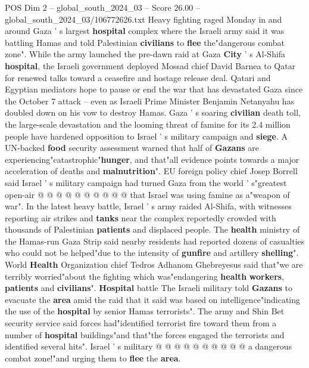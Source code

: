\begin{textsample}{POS Dim 2 – global\_south\_2024\_03 – Score 26.00 – global\_south\_2024\_03/106772626.txt}  \label{ex:f2_pos_014}
Heavy fighting raged Monday in and around Gaza ' s largest \textbf{hospital} complex where the Israeli army said it was battling Hamas and told Palestinian \textbf{civilians} to \textbf{flee} the"dangerous combat zone".
While the army launched the pre-dawn raid at Gaza \textbf{City} ' s Al-Shifa \textbf{hospital}, the Israeli government deployed Mossad chief David Barnea to Qatar for renewed talks toward a ceasefire and hostage release deal.
Qatari and Egyptian mediators hope to pause or end the war that has devastated Gaza since the October 7 attack -- even as Israeli Prime Minister Benjamin Netanyahu has doubled down on his vow to destroy Hamas.
Gaza ' s soaring \textbf{civilian} death toll, the large-scale devastation and the looming threat of famine for its 2.4 million people have hardened opposition to Israel ' s military campaign and \textbf{siege}.
A UN-backed \textbf{food} security assessment warned that half of \textbf{Gazans} are experiencing"catastrophic"\textbf{hunger}, and that"all evidence points towards a major acceleration of deaths and \textbf{malnutrition}".
EU foreign policy chief Josep Borrell said Israel ' s military campaign had turned Gaza from the world ' s"greatest open-air @ @ @ @ @ @ @ @ @ @ that Israel was using famine as a"weapon of war".
In the latest heavy battle, Israel ' s army raided Al-Shifa, with witnesses reporting air strikes and \textbf{tanks} near the complex reportedly crowded with thousands of Palestinian \textbf{patients} and displaced people.
The \textbf{health} ministry of the Hamas-run Gaza Strip said nearby residents had reported dozens of casualties who could not be helped"due to the intensity of \textbf{gunfire} and artillery \textbf{shelling}".
World \textbf{Health} Organization chief Tedros Adhanom Ghebreyesus said that"we are terribly worried"about the fighting which was"endangering \textbf{health} \textbf{workers}, \textbf{patients} and \textbf{civilians}". \textbf{Hospital} battle The Israeli military told \textbf{Gazans} to evacuate the \textbf{area} amid the raid that it said was based on intelligence"indicating the use of the \textbf{hospital} by senior Hamas terrorists".
The army and Shin Bet security service said forces had"identified terrorist fire toward them from a number of \textbf{hospital} buildings"and that"the forces engaged the terrorists and identified several hits".
Israel ' s military @ @ @ @ @ @ @ @ @ @ a dangerous combat zone!"and urging them to \textbf{flee} the \textbf{area}.

\end{textsample}
